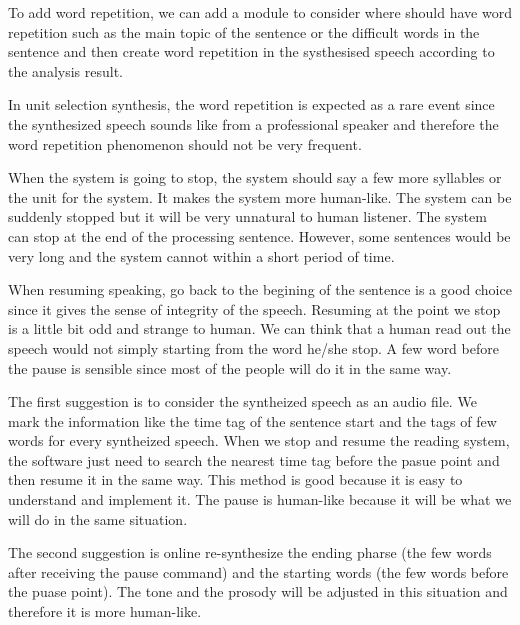 \documentclass[12pt]{article}
\newenvironment{problem}[2][Problem]{\begin{trivlist}
\item[\hskip \labelsep {\bfseries #1}\hskip \labelsep {\bfseries #2.}]}{\end{trivlist}}
\begin{document}
\begin{problem}{2.2}
    To add word repetition, we can add a module to consider where should have
    word repetition such as the main topic of the sentence or the difficult words
    in the sentence and then create word repetition in the systhesised speech according
    to the analysis result.

    In unit selection synthesis, the word repetition is expected as a rare event
    since the synthesized speech sounds like from a professional speaker and therefore
    the word repetition phenomenon should not be very frequent.
\end{problem}

\begin{problem}{2.3}
    When the system is going to stop,
    the system should say a few more syllables or the unit for the system. It 
    makes the system more human-like. The system can be suddenly stopped but it 
    will be very unnatural to human listener. The system can stop at the end of 
    the processing sentence. However, some sentences would be very long and the 
    system cannot within a short period of time.

    When resuming speaking, go back to the begining of the sentence is a good 
    choice since it gives the sense of integrity of the speech. Resuming at the 
    point we stop is a little bit odd and strange to human. We can think that 
    a human read out the speech would not simply starting from the word he/she stop.
    A few word before the pause is sensible since most of the people will do it 
    in the same way.

    The first suggestion is to consider the syntheized speech as an audio file.
    We mark the information like the time tag of the sentence start 
    and the tags of few words for every syntheized speech. When we stop and resume
    the reading system, the software just need to search the nearest time tag 
    before the pasue point and then resume it in the same way.
    This method is good because it is easy to understand and implement it.
    The pause is human-like because it will be what we will do in the same 
    situation.

    The second suggestion is online re-synthesize the ending pharse 
    (the few words after receiving the pause command) and the 
    starting words (the few words before the puase point). The tone and the prosody
    will be adjusted in this situation and therefore it is more human-like.

\end{problem}
\end{document}
